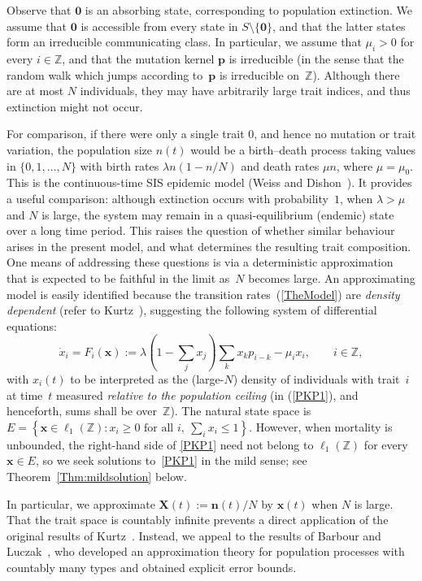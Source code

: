 \documentclass[12pt]{article}
\newcommand{\Z}{\ensuremath{\mathbb Z}}
\newcommand{\bp}{\boldsymbol{p}}
\newcommand{\bn}{\boldsymbol{n}}
\newcommand{\bX}{\boldsymbol{X}}
\newcommand{\BS}{\ensuremath{\ell_1(\Z)}}
\newcommand{\bzero}{\boldsymbol{0}}
\newcommand{\bx}{\boldsymbol{x}}
\begin{document}
Observe that $\bzero$ is an absorbing state, corresponding to population
extinction. We assume that $\bzero$ is accessible from every state in
$S\setminus\{\bzero\}$, and that the latter states form an irreducible
communicating class. In particular, we assume that $\mu_i>0$ for every
$i\in\Z$, and that the mutation kernel $\bp$ is irreducible (in the
sense that the random walk which jumps according to~$\bp$ is irreducible
on~$\Z$). Although there are at most $N$ individuals, they may have
arbitrarily large trait indices, and thus extinction might not occur.

For comparison, if there were only a single trait $0$, and hence no
mutation or trait variation, the population size $n(t)$ would be a
birth--death process taking values in $\{0,1,\ldots,N\}$ with birth
rates $\lambda n(1-n/N)$ and death rates $\mu n$, where $\mu=\mu_0$.
This is the continuous-time SIS epidemic model (Weiss and
Dishon~\cite{WD71}). It provides a useful comparison: although
extinction occurs with probability~$1$, when $\lambda>\mu$ and $N$ is
large, the system may remain in a quasi-equilibrium (endemic) state over
a long time period. This raises the question of whether similar
behaviour arises in the present model, and what determines the resulting
trait composition. One means of addressing these questions is via a
deterministic approximation that is expected to be faithful in the limit
as~$N$ becomes large. An approximating model is easily identified
because the transition rates~(\ref{TheModel}) are {\em density
dependent\/} (refer to Kurtz~\cite{Kur70}), suggesting the following
system of differential equations:
\begin{equation}
\dot x_i = F_i(\bx):=
\lambda\left(1-\sum_jx_j\right)\sum_kx_kp_{i-k} -\mu_i x_i, 
\qquad i\in\Z,
\label{PKP1} 
\end{equation}
with $x_i(t)$ to be interpreted as the (large-$N$) density of
individuals with trait~$i$ at time~$t$ measured {\em relative to the
population ceiling\/} (in (\ref{PKP1}), and henceforth, sums shall be
over~$\Z$).
The natural state space is
$E=
\left\{\bx\in\BS: x_i\geq0\text{ for all }i,\ \sum_i
x_i\leq1\right\}$.
However, when mortality is unbounded, the right-hand side of
\eqref{PKP1} need not belong to $\BS$ for every $\bx\in E$, so we seek
solutions to~\eqref{PKP1} in the mild sense; see
Theorem~\ref{Thm:mildsolution} below.

In particular, we approximate $\bX(t):=\bn(t)/N$ by $\bx(t)$
when $N$ is large. That the trait space is countably infinite prevents a
direct application of the original results of Kurtz~\cite{Kur70,Kur71}.
Instead, we appeal to the results of Barbour and Luczak~\cite{BL12b},
who developed an approximation theory for population processes with
countably many types and obtained explicit error bounds.
\end{document}
